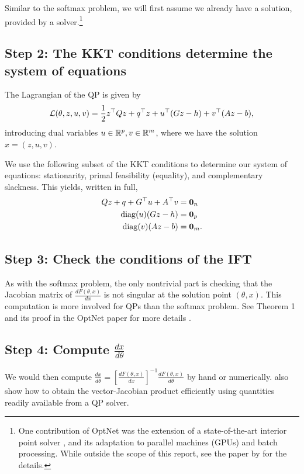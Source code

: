 \documentclass[11pt]{article}
\begin{document}
Similar to the softmax problem, we will first assume we already have a solution,
provided by a solver.\footnote{
One contribution of OptNet was the extension of a state-of-the-art interior point
solver \citep{optnet}, and its adaptation to parallel machines (GPUs) and batch processing.
While outside the scope of this report, see the paper by \citet{optnet} for the details.
}

\subsection*{Step 2: The KKT conditions determine the system of equations}
The Lagrangian of the QP is given by
$$
\mathcal{L}(\theta,z,u,v) = \frac12 z^\top Qz + q^\top z + u^\top(Gz-h) + v^\top(Az-b),
$$
introducing dual variables $u\in\mathbb{R}^p,v\in\mathbb{R}^m$,
where we have the solution $x = (z,u,v)$.

We use the following subset of the KKT conditions to determine our system of equations:
stationarity, primal feasibility (equality), and complementary slackness.
This yields, written in full,
\begin{equation}
\begin{aligned}
Qz + q + G^\top u + A^\top v  &= \mathbf{0}_n\\
\mathrm{diag}(u)(Gz-h) &= \mathbf{0}_p\\
\mathrm{diag}(v)(Az-b) &= \mathbf{0}_m.
\end{aligned}
\end{equation}

\subsection*{Step 3: Check the conditions of the IFT}
As with the softmax problem,
the only nontrivial part is checking that the Jacobian matrix of $\frac{dF(\theta,x)}{dx}$ is
not singular at the solution point $(\theta,x)$.
This computation is more involved for QPs than the softmax problem. 
See Theorem 1 and its proof in the OptNet paper for more details \citep{optnet}.

\subsection*{Step 4: Compute $\frac{dx}{d\theta}$}
We would then compute
$\frac{dx}{d\theta} = \left[\frac{dF(\theta,x)}{dx}\right]^{-1}\frac{dF(\theta,x)}{d\theta}$
by hand or numerically.
\citet{optnet} also show how to obtain the vector-Jacobian product efficiently
using quantities readily available from a QP solver.
\end{document}
